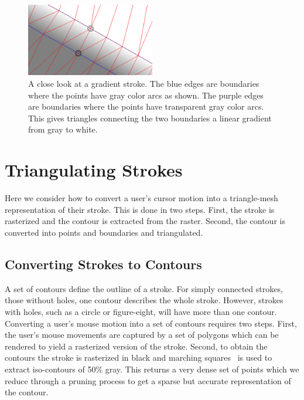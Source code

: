 \documentclass[review]{acmsiggraph}
\begin{document}
\begin{figure}
    \centering
        \includegraphics[width=0.5\textwidth]{images/gradientarcs}
    \caption{A close look at a gradient stroke. The blue edges are boundaries where
    the points have gray color arcs as shown. The purple edges are boundaries where
    the points have transparent gray color arcs. This gives triangles connecting the two boundaries
    a linear gradient from gray to white.}
    \label{fig:softarcs}
\end{figure}

\section{Triangulating Strokes}

Here we consider how to convert a user's cursor motion into a triangle-mesh representation
of their stroke. This is done in two steps. First, the stroke is rasterized and the
contour is extracted from the raster. Second, the contour is converted into points and
boundaries and triangulated.

\subsection{Converting Strokes to Contours}
A set of contours define the outline of a stroke. For simply connected strokes, those without holes, 
one contour describes the whole stroke. However, strokes with holes, such as a circle or 
figure-eight, will have more than one contour.
Converting a user's mouse motion into a set of contours requires two steps.
First, the user's mouse movements are captured by a set of polygons which can be
rendered to yield a rasterized version of the stroke.
Second, to obtain the contours the stroke is rasterized in black and marching squares~\cite{XXX}
is used to extract iso-contours of 50\% gray. This returns a very dense set of points 
which we reduce through a pruning process to
get a sparse but accurate representation of the contour.


\end{document}
